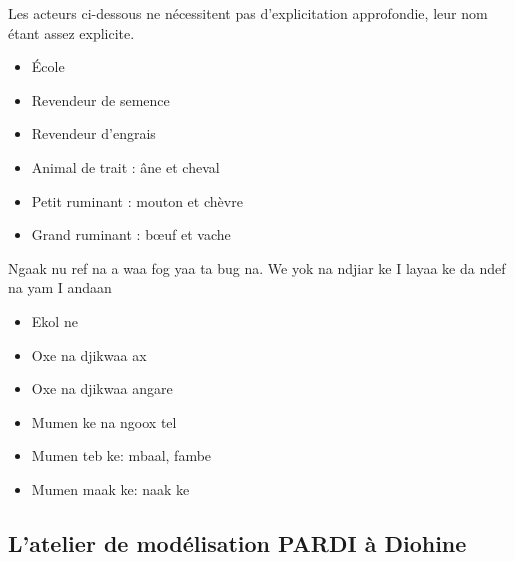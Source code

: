 \begin{paracol}{2}
  Les acteurs ci-dessous ne nécessitent pas d'explicitation approfondie, leur nom étant assez explicite.

  \begin{itemize}
    \item École
    \item Revendeur de semence
    \item Revendeur d'engrais
    \item Animal de trait : âne et cheval
    \item Petit ruminant : mouton et chèvre
    \item Grand ruminant : bœuf et vache
  \end{itemize}
  \switchcolumn %
  Ngaak nu ref na a waa fog yaa ta bug na. We yok na ndjiar ke I layaa ke da ndef na yam I andaan
  \begin{itemize}
    \item Ekol ne
    \item Oxe na djikwaa ax
    \item Oxe na djikwaa angare
    \item Mumen ke na ngoox tel
    \item Mumen teb ke: mbaal, fambe
    \item Mumen maak ke: naak ke
  \end{itemize}

\end{paracol}

\subsection{L'atelier de modélisation PARDI à Diohine }

